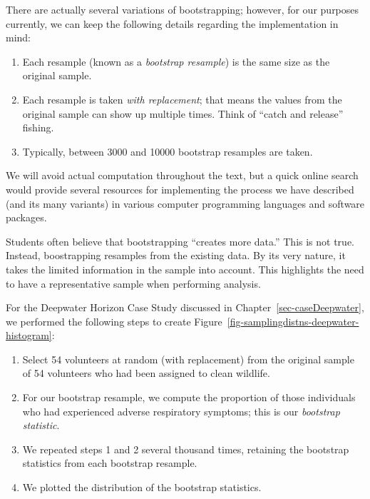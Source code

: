 \documentclass[
  letterpaper,
  DIV=11,
  numbers=noendperiod]{scrreprt}
\providecommand{\tightlist}{%
  \setlength{\itemsep}{0pt}\setlength{\parskip}{0pt}}\usepackage{longtable,booktabs,array}
\theoremstyle{plain}
\theoremstyle{definition}
\theoremstyle{definition}
\theoremstyle{remark}
\begin{document}
There are actually several variations of bootstrapping; however, for our
purposes currently, we can keep the following details regarding the
implementation in mind:

\begin{enumerate}
\def\labelenumi{\arabic{enumi}.}
\tightlist
\item
  Each resample (known as a \emph{bootstrap resample}) is the same size
  as the original sample.
\item
  Each resample is taken \emph{with replacement}; that means the values
  from the original sample can show up multiple times. Think of ``catch
  and release'' fishing.
\item
  Typically, between 3000 and 10000 bootstrap resamples are taken.
\end{enumerate}

We will avoid actual computation throughout the text, but a quick online
search would provide several resources for implementing the process we
have described (and its many variants) in various computer programming
languages and software packages.

\begin{tcolorbox}[enhanced jigsaw, breakable, titlerule=0mm, colframe=quarto-callout-tip-color-frame, bottomtitle=1mm, opacityback=0, rightrule=.15mm, toptitle=1mm, arc=.35mm, bottomrule=.15mm, left=2mm, title=\textcolor{quarto-callout-tip-color}{\faLightbulb}\hspace{0.5em}{Big Idea}, leftrule=.75mm, coltitle=black, toprule=.15mm, colbacktitle=quarto-callout-tip-color!10!white, colback=white, opacitybacktitle=0.6]

Students often believe that bootstrapping ``creates more data.'' This is
not true. Instead, boostrapping resamples from the existing data. By its
very nature, it takes the limited information in the sample into
account. This highlights the need to have a representative sample when
performing analysis.

\end{tcolorbox}

For the Deepwater Horizon Case Study discussed in
Chapter~\ref{sec-caseDeepwater}, we performed the following steps to
create Figure~\ref{fig-samplingdistns-deepwater-histogram}:

\begin{enumerate}
\def\labelenumi{\arabic{enumi}.}
\tightlist
\item
  Select 54 volunteers at random (with replacement) from the original
  sample of 54 volunteers who had been assigned to clean wildlife.
\item
  For our bootstrap resample, we compute the proportion of those
  individuals who had experienced adverse respiratory symptoms; this is
  our \emph{bootstrap statistic}.
\item
  We repeated steps 1 and 2 several thousand times, retaining the
  bootstrap statistics from each bootstrap resample.
\item
  We plotted the distribution of the bootstrap statistics.
\end{enumerate}
\end{document}
